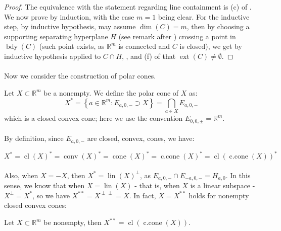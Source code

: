 \begin{proof}
	The equivalence with the statement regarding line containment is (c) of . We now prove by induction, with the case $m=1$ being clear. For the inductive step, by inductive hypothesis, may assume $\dim(C)=m$, then by choosing a supporting separating hyperplane $H$ (see remark after ) crossing a point in $\operatorname{bdy}(C)$ (such point exists, as $\mathbb{R}^m$ is connected and $C$ is closed), we get by inductive hypothesis applied to $C\cap H$, , and (f) of  that $\operatorname{ext}(C)\neq\emptyset$.
\end{proof}

\paragraph{}Now we consider the construction of polar cones.

\begin{defn}\label{defn:016-polar-cone}
	Let $X\subset \mathbb{R}^m$ be a nonempty. We define the polar cone of $X$ as:
	\[
		X^\ast=
		\left\{a\in \mathbb{R}^m:E_{a,0,-}\supset X\right\}=
		\bigcap_{a\in X}E_{a,0,-}
	\]
	which is a closed convex cone; here we use the convention $E_{0,0,\pm}=\mathbb{R}^m$.
\end{defn}

\paragraph{}By definition, since $E_{a,0,-}$ are closed, convex, cones, we have:

\[
	X^\ast = \operatorname{cl}(X)^\ast = \operatorname{conv}(X)^\ast =
	\operatorname{cone}(X)^\ast = \operatorname{c.cone}(X)^\ast = \operatorname{cl}(\operatorname{c.cone}(X))^\ast
\]

\paragraph{}Also, when $X=-X$, then $X^\ast=\operatorname{lin}(X)^\perp$, as $E_{a,0,-}\cap E_{-a,0,-}=H_{a,0}$. In this sense, we know that when $X=\operatorname{lin}(X)$ - that is, when $X$ is a linear subspace - $X^\perp=X^\ast$, so we have $X^{\ast\ast}=X^{\perp\perp}=X$. In fact, $X=X^{\ast\ast}$ holds for nonempty closed convex cones:

\begin{lemm}\label{lemm:016-polar-cone-theorem}
	Let $X\subset \mathbb{R}^m$ be nonempty, then $X^{\ast\ast}=\operatorname{cl}(\operatorname{c.cone}(X))$.
\end{lemm}

